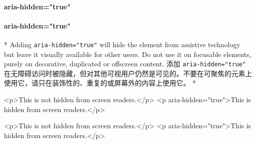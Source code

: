 \begin{paracol}{2}
\paragraph{aria-hidden="true"}
\switchcolumn
\paragraph{aria-hidden="true"}
\switchcolumn[0]*%
Adding \texttt{aria-hidden="true"} will hide the element from assistive
technology but leave it visually available for other users. Do not use
it on focusable elements, purely on decorative, duplicated or offscreen
content.
\switchcolumn
添加 \texttt{aria-hidden="true"}
在无障碍访问时被隐藏，但对其他可视用户仍然是可见的。不要在可聚焦的元素上使用它，请只在装饰性的、重复的或屏幕外的内容上使用它。
\switchcolumn[0]*%
\begin{codeHtml}
<p>This is not hidden from screen readers.</p>
<p aria-hidden="true">This is hidden from screen readers.</p>
\end{codeHtml}
\switchcolumn
\begin{codeHtml}
<p>This is not hidden from screen readers.</p>
<p aria-hidden="true">This is hidden from screen readers.</p>
\end{codeHtml}
\end{paracol}


